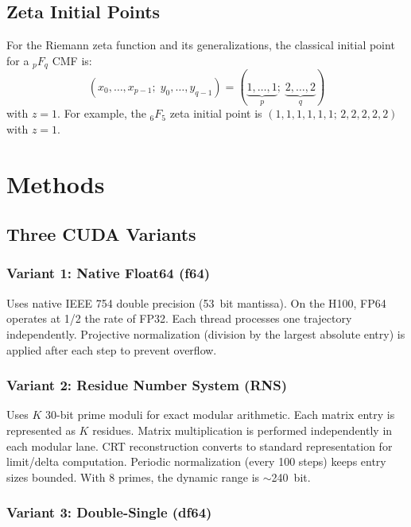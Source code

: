 \documentclass[11pt,a4paper]{article}
\begin{document}
\subsection{Zeta Initial Points}

For the Riemann zeta function and its generalizations, the classical initial
point for a ${}_pF_q$ CMF is:
\[
(x_0, \ldots, x_{p-1};\; y_0, \ldots, y_{q-1}) = (\underbrace{1,\ldots,1}_{p};\; \underbrace{2,\ldots,2}_{q})
\]
with $z = 1$. For example, the ${}_6F_5$ zeta initial point is
$(1,1,1,1,1,1;\, 2,2,2,2,2)$ with $z=1$.

\section{Methods}

\subsection{Three CUDA Variants}

\subsubsection{Variant 1: Native Float64 (f64)}

Uses native IEEE 754 double precision (\SI{53}{bit} mantissa). On the H100,
FP64 operates at 1/2 the rate of FP32. Each thread processes one trajectory
independently. Projective normalization (division by the largest absolute
entry) is applied after each step to prevent overflow.

\subsubsection{Variant 2: Residue Number System (RNS)}

Uses $K$ 30-bit prime moduli for exact modular arithmetic. Each matrix entry
is represented as $K$ residues. Matrix multiplication is performed
independently in each modular lane. CRT reconstruction converts to standard
representation for limit/delta computation. Periodic normalization (every
100 steps) keeps entry sizes bounded. With 8 primes, the dynamic range is
$\sim$\SI{240}{bit}.

\subsubsection{Variant 3: Double-Single (df64)}
\end{document}
